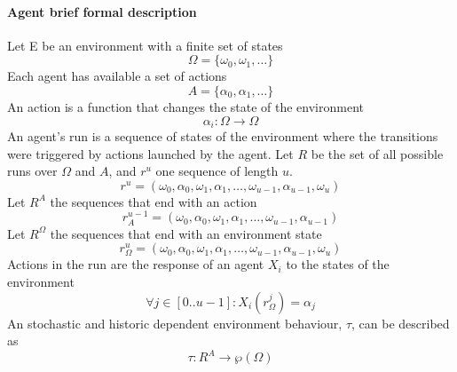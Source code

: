 \documentclass[11pt,oneside,a4paper,openright]{report}
\begin{document}

\paragraph{Agent brief formal description}
	
Let E be an environment with a finite set of states 
\begin{equation}
	\Omega = \{\omega_0,\omega_1,\ldots \}
\end{equation}
Each agent has available a set of actions 
\begin{equation}
	A = \{ \alpha_0, \alpha_1, \ldots \} 
\end{equation}
An action is a function that changes the state of the environment 
\begin{equation}
	\alpha_i : \Omega \longrightarrow \Omega 
\end{equation}
An agent's run is a sequence of states of the environment where the transitions were triggered 
by actions launched by the agent. Let $R$ be the set of all possible runs over $\Omega$ and $A$, and
$r^{u}$ one sequence of length $u$.
\begin{equation}
	r^{u} = ( \omega_0 , \alpha_0 , \omega_1 , \alpha_1 ,\ldots, \omega_{u-1} , \alpha_{u-1} , \omega_u )
\end{equation}
Let $R^{A}$ the sequences that end with an action 
\begin{equation}
	r^{u-1}_{A} = ( \omega_0 , \alpha_0 , \omega_1 , \alpha_1 ,\ldots, \omega_{u-1} , \alpha_{u-1} )
\end{equation}
Let $R^{\Omega}$ the sequences that end with an environment state 
\begin{equation}
	r^{u}_{\Omega} = ( \omega_0 , \alpha_0 , \omega_1 , \alpha_1 ,\ldots, \omega_{u-1} , \alpha_{u-1} , \omega_u )
\end{equation}
Actions in the run are the response of an agent $X_i$ to the states of the environment
\begin{equation}
	\forall j \in [0..u-1] : X_i(r^{j}_{\Omega}) = \alpha_j
\end{equation}
An stochastic and historic dependent environment behaviour, $\tau$, can be described as
\begin{equation}
	\tau : R^{A} \longrightarrow \wp(\Omega)
\end{equation}
\end{document}
